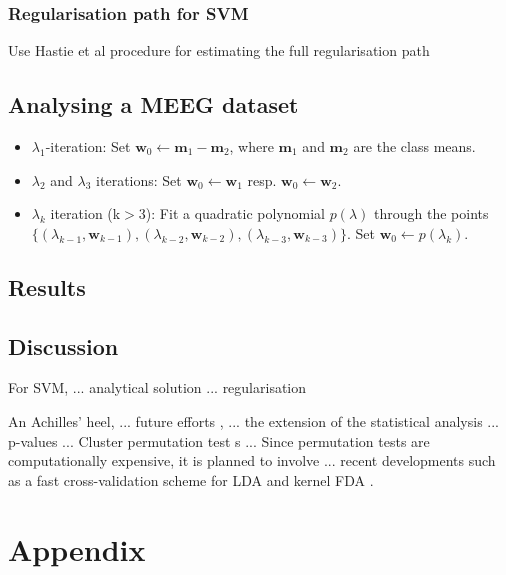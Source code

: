 \documentclass[utf8]{frontiersSCNS} %
\newcommand{\m}{\mathbf{m}}
\newcommand{\w}{\mathbf{w}}
\begin{document}
\subsubsection{Regularisation path for SVM}
Use Hastie et al procedure for estimating the full regularisation path


\subsection{Analysing a MEEG dataset}




\begin{itemize}
\item $\lambda_1$-iteration: Set $\w_0\leftarrow \m_1 - \m_2$, where $\m_1$ and $\m_2$ are the class means.
\item $\lambda_2$ and $\lambda_3$ iterations: Set $\w_0\leftarrow \w_1$ resp. $\w_0\leftarrow \w_2$.
\item $\lambda_k$ iteration (k$>$3): Fit a quadratic polynomial $p(\lambda)$ through the points $\{(\lambda_{k-1},\w_{k-1}), (\lambda_{k-2},\w_{k-2}), (\lambda_{k-3},\w_{k-3})\}$. Set $\w_0 \leftarrow p(\lambda_k)$.
\end{itemize}


\subsection{Results}

\subsection{Discussion}


For SVM, ... analytical solution ... regularisation \citep{Hastie2004TheMachine}


An Achilles' heel, ... future efforts , ... the extension of the statistical analysis ... p-values ... Cluster permutation test s ... Since permutation tests are computationally expensive, it is planned to involve ... recent developments such as a fast cross-validation scheme for LDA and kernel FDA \citep{Treder2019DirectFDA}.

\section{Appendix}
\end{document}
